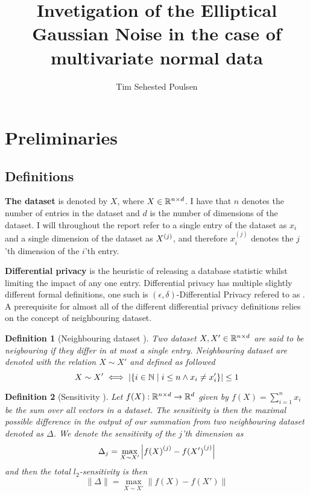 \documentclass[a4paper,12pt]{article}
\title{Invetigation of the Elliptical Gaussian Noise in the case of multivariate normal data}
\author{Tim Sehested Poulsen}
\newtheorem{definition}{Definition}[section]
\begin{document}
\maketitle

\section{Preliminaries}
\subsection{Definitions}

\textbf{The dataset} is denoted by $X$, where 
$X \in \mathbb{R}^{n \times d}$.
I have that $n$ denotes the number of entries in the dataset and 
$d$ is the number of dimensions of the dataset.
I will throughout the report refer to a single entry of 
the dataset as $x_i$ and a single dimension of the dataset as $X^{(j)}$, 
and therefore $x^{(j)}_i$
denotes the $j$'th dimension of the $i$'th entry.
\vspace*{0.3cm}

\textbf{Differential privacy} is the heuristic of 
releasing a database statistic whilst limiting the impact
of any one entry. 
Differential privacy has multiple slightly different
formal definitions, 
one such is $(\epsilon, \delta)$-Differential Privacy
refered to as \edp.
A prerequisite for almost all of the different differential privacy
definitions relies on the concept of neighbouring dataset.
\vspace*{0.3cm}

\begin{definition}[Neighbouring dataset \cite{dwork2016}]
Two dataset $X, X' \in \mathbb{R}^{n \times d}$ are said to be 
neigbouring if they differ in at most a single entry.
Neighbouring dataset are denoted with the relation $X \sim X'$ and defined as followed
\[ X \sim X' \iff \left | \left \{ i \in \mathbb{N} \; \text{\textbar} \; i \le n \land x_i \ne x_i' \right\} \right| \le 1 \]
\end{definition}

\begin{definition}[Sensitivity \cite{Lebeda2022}]
Let $f(X): \mathbb{R}^{n \times d} \rightarrow \mathbb{R}^d$ given by 
$f(X) = \sum_{i = 1}^n x_i$ be the sum over all vectors in a dataset.
The sensitivity is then the maximal 
possible difference in the output of our summation  
from two neighbouring dataset denoted as $\Delta$.
We denote the sensitivity of the $j$'th dimension as
\[ \Delta_j = \max_{X \sim X'} \left |{f(X)}^{(j)} - {f(X')}^{(j)}\right| \]
and then the total $l_2$-sensitivity is then
\[ \| \Delta \| = \max_{X \sim X'} \left\| {f(X)} - {f(X')} \right\|  \]
    
\end{definition}
\end{document}
